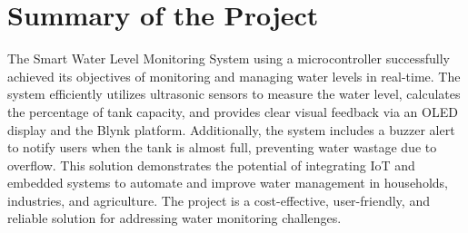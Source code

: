 \section{Summary of the Project}
{
\fontsize{12}{14}\selectfont
\noindent
    The Smart Water Level Monitoring System using a microcontroller successfully achieved its objectives of monitoring and managing water levels in real-time. The system efficiently utilizes ultrasonic sensors to measure the water level, calculates the percentage of tank capacity, and provides clear visual feedback via an OLED display and the Blynk platform. Additionally, the system includes a buzzer alert to notify users when the tank is almost full, preventing water wastage due to overflow. This solution demonstrates the potential of integrating IoT and embedded systems to automate and improve water management in households, industries, and agriculture. The project is a cost-effective, user-friendly, and reliable solution for addressing water monitoring challenges.
} 

\vspace{0.2cm}
